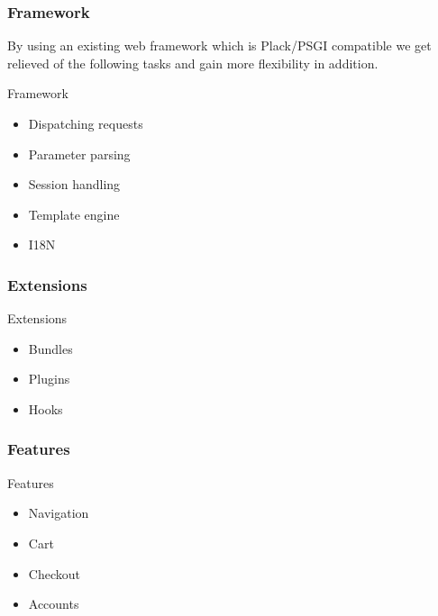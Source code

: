 \subsubsection{Framework}
By using an existing web framework which is Plack/PSGI compatible
we get relieved of the following
tasks and gain more flexibility in
addition.
 
\begin{frame}{Framework}
\begin{itemize}
\item Dispatching requests
\item Parameter parsing
\item Session handling
\item Template engine
\item I18N
\end{itemize}
\end{frame}

\subsubsection{Extensions}
\begin{frame}{Extensions}
\begin{itemize}
\item Bundles
\item Plugins
\item Hooks
\end{itemize}
\end{frame}

\subsubsection{Features}
\begin{frame}{Features}
\begin{itemize}
\item Navigation
\item Cart
\item Checkout
\item Accounts
\end{itemize}
\end{frame}


